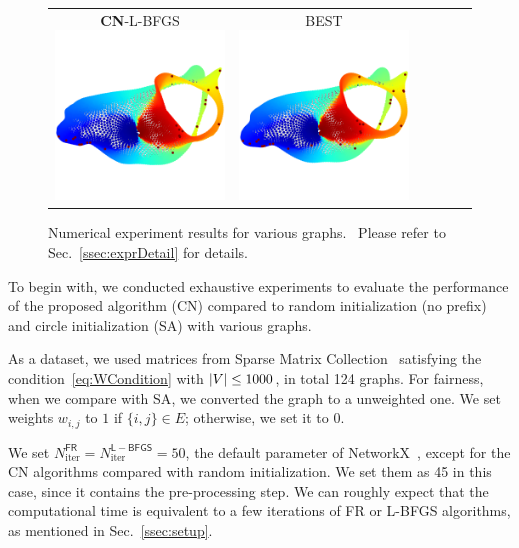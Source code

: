 \documentclass[dvipdfmx,10pt,journal,compsoc]{IEEEtran}
\begin{document}
\begin{figure}[btp]
\begin{tabular}{cccccc}
    \makecell{\small{\textsf{\textbf{CN}-L-BFGS}}                                                                                                        \\[-0.2em]\includegraphics[width=0.27\columnwidth]{individual/vis/3elt_CN-L-BFGS.png}} &
    \makecell{\small{\textsf{BEST}}                                                                                                                      \\[-0.2em]\includegraphics[width=0.27\columnwidth]{individual/vis/opt_3elt.png}} \\
  \end{tabular}
  \caption{Numerical experiment results for various graphs.  Please refer to Sec.~\ref{ssec:exprDetail} for details.}
  \label{fig:individual}
\end{figure}

To begin with, we conducted exhaustive experiments to evaluate the performance of the proposed algorithm (\textsf{CN}) compared to random initialization (no prefix) and circle initialization (\textsf{SA}) with various graphs.

As a dataset, we used matrices from Sparse Matrix Collection~\cite{davis2011university} satisfying the condition~\eqref{eq:WCondition} with $\abs{V} \leq 1000$, in total 124 graphs.
For fairness, when we compare with \textsf{SA}, we converted the graph to a unweighted one. We set weights $w_{i,j}$ to $1$ if $\{ i,j \} \in E$; otherwise, we set it to $0$.

We set $N_\mathrm{iter}^\mathsf{FR}=N_\mathrm{iter}^\mathsf{L-BFGS}=50$, the default parameter of NetworkX~\cite{hagberg2008exploring}, except for the \textsf{CN} algorithms compared with random initialization.
We set them as 45 in this case, since it contains the pre-processing step. We can roughly expect that the computational time is equivalent to a few iterations of FR or L-BFGS algorithms, as mentioned in Sec.~\ref{ssec:setup}.
\end{document}
